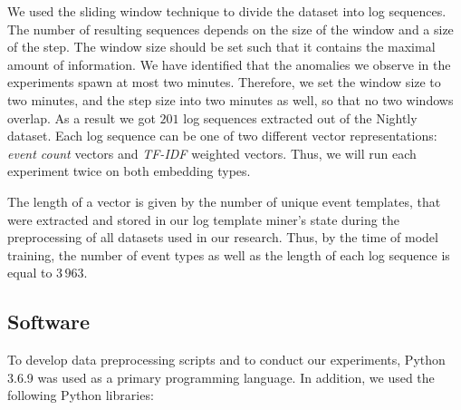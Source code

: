 We used the sliding window technique to divide the dataset into log sequences. The number of resulting sequences depends on the size of the window and a size of the step.  The window size should be set such that it contains the maximal amount of information. We have identified that the anomalies we observe in the experiments spawn at most two minutes. Therefore, we set the window size to two minutes, and the step size into two minutes as well, so that no two windows overlap. As a result we got $201$ log sequences extracted out of the Nightly dataset. Each log sequence can be one of two different vector representations: \textit{event count} vectors and \textit{TF-IDF} weighted vectors. Thus, we will run each experiment twice on both embedding types.

The length of a vector is given by the number of unique event templates, that were extracted and stored in our log template miner's state during the preprocessing of all datasets used in our research. Thus, by the time of model training, the number of event types as well as the length of each log sequence is equal to $3\,963$.

\begin{table}[h]
\centering
{}
    \caption{Summary of statistics of the Nightly dataset used for training and Testing dataset used for model evaluation and hyperparameter tuning.}
    \label{tab:training}
\end{table}

\subsection{Software}
To develop data preprocessing scripts and to conduct our experiments, Python 3.6.9 was used as a primary programming language. In addition, we used the following Python libraries: 

